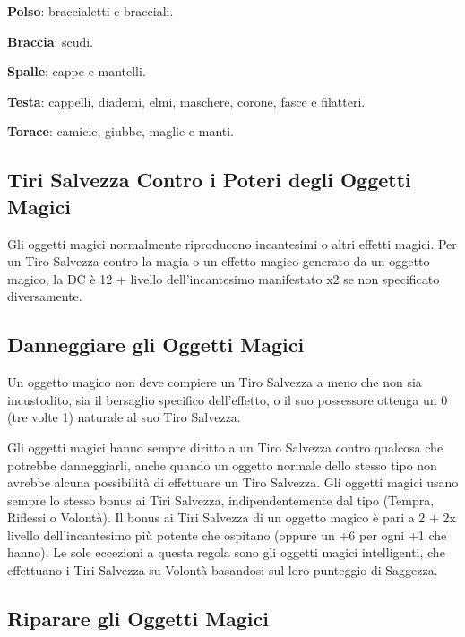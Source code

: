 \begin{multicols}{2}
\textbf{Polso}: braccialetti e bracciali.

\textbf{Braccia}: scudi.

\textbf{Spalle}: cappe e mantelli.

\textbf{Testa}: cappelli, diademi, elmi, maschere, corone, fasce e filatteri.

\textbf{Torace}: camicie, giubbe, maglie e manti.

\subsection{Tiri Salvezza Contro i Poteri degli Oggetti Magici}

\label{tiri-salvezza-contro-i-poteri-degli-oggetti-magici}

Gli oggetti magici normalmente riproducono incantesimi o altri effetti magici. Per un Tiro Salvezza contro la magia o un effetto magico generato da un oggetto magico, la DC è 12 + livello dell'incantesimo manifestato x2 se non specificato diversamente.

\subsection{Danneggiare gli Oggetti Magici}

\label{danneggiare-gli-oggetti-magici}

Un oggetto magico non deve compiere un Tiro Salvezza a meno che non sia incustodito, sia il bersaglio specifico dell'effetto, o il suo possessore ottenga un 0 (tre volte 1) naturale al suo Tiro Salvezza.

Gli oggetti magici hanno sempre diritto a un Tiro Salvezza contro qualcosa che potrebbe danneggiarli, anche quando un oggetto normale dello stesso tipo non avrebbe alcuna possibilità di effettuare un Tiro Salvezza. Gli oggetti magici usano sempre lo stesso bonus ai Tiri Salvezza, indipendentemente dal tipo (Tempra, Riflessi o Volontà). Il bonus ai Tiri Salvezza di un oggetto magico è pari a 2 + 2x livello dell'incantesimo più potente che ospitano (oppure un +6 per ogni +1 che hanno). Le sole eccezioni a questa regola sono gli oggetti magici intelligenti, che effettuano i Tiri Salvezza su Volontà basandosi sul loro punteggio di Saggezza.

\subsection{Riparare gli Oggetti Magici}
\label{riparare-gli-oggetti-magici}


\end{multicols}
